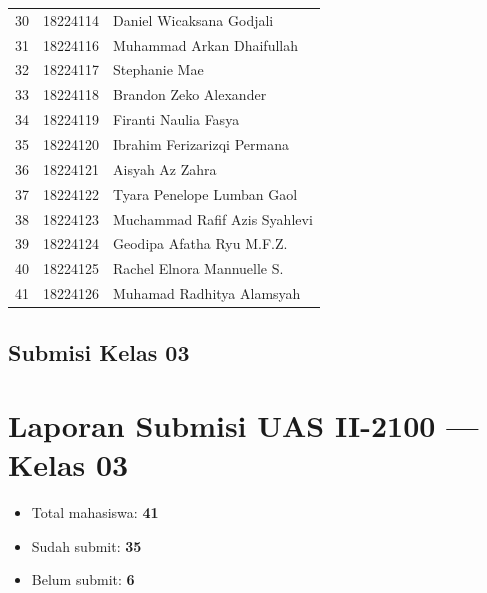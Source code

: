 \documentclass[
  letterpaper,
  DIV=11,
  numbers=noendperiod]{scrreprt}
\providecommand{\tightlist}{%
  \setlength{\itemsep}{0pt}\setlength{\parskip}{0pt}}
\begin{document}
\begin{longtable}[]{@{}lll@{}}
30 & 18224114 & Daniel Wicaksana Godjali \\
31 & 18224116 & Muhammad Arkan Dhaifullah \\
32 & 18224117 & Stephanie Mae \\
33 & 18224118 & Brandon Zeko Alexander \\
34 & 18224119 & Firanti Naulia Fasya \\
35 & 18224120 & Ibrahim Ferizarizqi Permana \\
36 & 18224121 & Aisyah Az Zahra \\
37 & 18224122 & Tyara Penelope Lumban Gaol \\
38 & 18224123 & Muchammad Rafif Azis Syahlevi \\
39 & 18224124 & Geodipa Afatha Ryu M.F.Z. \\
40 & 18224125 & Rachel Elnora Mannuelle S. \\
41 & 18224126 & Muhamad Radhitya Alamsyah \\
\end{longtable}

\section*{Submisi Kelas 03}\label{submisi-kelas-03}



\chapter*{Laporan Submisi UAS II-2100 --- Kelas
03}\label{laporan-submisi-uas-ii-2100-kelas-03}


\begin{itemize}
\tightlist
\item
  Total mahasiswa: \textbf{41}
\item
  Sudah submit: \textbf{35}
\item
  Belum submit: \textbf{6}
\end{itemize}
\end{document}
